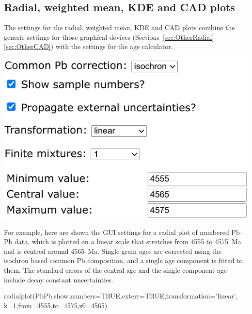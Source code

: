 \begin{refsection}
\section{Radial, weighted mean, KDE and CAD plots}
\label{sec:ArArKCaOtherPlots}

The settings for the radial, weighted mean, KDE and CAD plots combine
the generic settings for those graphical devices
(Sections~\ref{sec:OtherRadial}--\ref{sec:OtherCAD}) with the settings
for the age calculator.\\

\noindent\begin{minipage}[t]{.45\linewidth}
\strut\vspace*{-\baselineskip}\newline
\includegraphics[width=\linewidth]{../figures/PbPbRadialOptions.png}
\end{minipage}
\begin{minipage}[t]{.55\linewidth}
  For example, here are shown the GUI settings for a radial plot of
  numbered Pb--Pb data, which is plotted on a linear scale that
  stretches from 4555 to 4575~Ma and is centred around 4565~Ma. Single
  grain ages are corrected using the isochron based common Pb
  composition, and a single age component is fitted to them. The
  standard errors of the central age and the single component age
  include decay constant uncertainties.
\end{minipage}

\begin{console}
radialplot(PbPb,show.numbers=TRUE,exterr=TRUE,transformation='linear',
           k=1,from=4555,to=4575,z0=4565)
\end{console}


\end{refsection}
